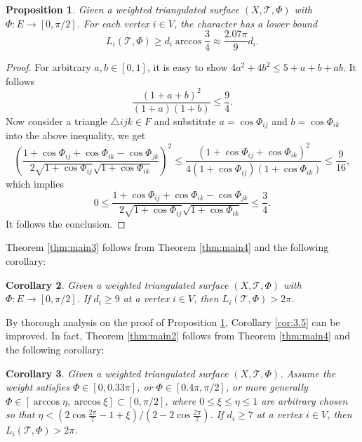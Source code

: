 \documentclass[12pt]{amsart}
\numberwithin{equation}{section}
\newtheorem{prop}{Proposition}[section]
\newtheorem{cor}[prop]{Corollary}
\begin{document}
\begin{prop}\label{prop:3.6}
Given a weighted triangulated surface $(X,\mathcal{T},\Phi)$ with $\Phi : E \to [0,\pi/2]$. For each
vertex $i \in V$, the character has a lower bound
\[
L_i(\mathcal{T},\Phi) \geq d_i \arccos \frac{3}{4} \approx \frac{2.07\pi}{9} d_i.
\]
\end{prop}

\begin{proof}
For arbitrary $a, b \in [0,1]$, it is easy to show $4a^2 + 4b^2 \leq 5 + a + b + ab$. It follows
\[
\frac{(1 + a + b)^2}{(1 + a)(1 + b)} \leq \frac{9}{4}.
\]
Now consider a triangle $\triangle ijk \in F$ and substitute $a = \cos\Phi_{ij}$ and $b = \cos\Phi_{ik}$ into the above inequality,
we get
\[
\left(\frac{1 + \cos\Phi_{ij} + \cos\Phi_{ik} - \cos\Phi_{jk}}{2\sqrt{1 + \cos\Phi_{ij}}\sqrt{1 + \cos\Phi_{ik}}}\right)^2 \leq \frac{(1 + \cos\Phi_{ij} + \cos\Phi_{ik})^2}{4(1 + \cos\Phi_{ij})(1 + \cos\Phi_{ik})} \leq \frac{9}{16},
\]
which implies
\begin{equation}\label{eq:3.5}
0 \leq \frac{1 + \cos\Phi_{ij} + \cos\Phi_{ik} - \cos\Phi_{jk}}{2\sqrt{1 + \cos\Phi_{ij}}\sqrt{1 + \cos\Phi_{ik}}} \leq \frac{3}{4}.
\end{equation}
It follows the conclusion.
\end{proof}

Theorem \ref{thm:main3} follows from Theorem \ref{thm:main4} and the following corollary:

\begin{cor}\label{cor:3.7}
Given a weighted triangulated surface $(X,\mathcal{T},\Phi)$ with $\Phi: E \to [0,\pi/2]$. If $d_i \geq 9$ at a
vertex $i \in V$, then $L_i(\mathcal{T},\Phi) > 2\pi$.
\end{cor}

By thorough analysis on the proof of Proposition \ref{prop:3.6}, Corollary \ref{cor:3.5} can be improved. In fact, Theorem
\ref{thm:main2} follows from Theorem \ref{thm:main4} and the following corollary:

\begin{cor}\label{cor:3.8}
Given a weighted triangulated surface $(X,\mathcal{T},\Phi)$. Assume the weight satisfies $\Phi \in
[0, 0.33\pi]$, or $\Phi \in [0.4\pi, \pi/2]$, or more generally $\Phi \in [\arccos\eta, \arccos\xi] \subset [0,\pi/2]$, where $0 \leq \xi \leq \eta \leq 1$
are arbitrary chosen so that $\eta < (2\cos\frac{2\pi}{7} - 1 + \xi)/(2 - 2\cos\frac{2\pi}{7})$. If $d_i \geq 7$ at a vertex $i \in V$, then
$L_i(\mathcal{T},\Phi) > 2\pi$.
\end{cor}
\end{document}
